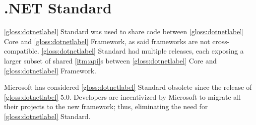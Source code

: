 \section{.NET Standard} \label{sec:netStandard}
\ref{gloss:dotnetlabel} Standard was used to share code between \ref{gloss:dotnetlabel} Core and \ref{gloss:dotnetlabel} Framework, as said frameworks are not cross-compatible. \ref{gloss:dotnetlabel} Standard had multiple releases, each exposing a larger subset of shared \ref{itm:api}s between \ref{gloss:dotnetlabel} Core and \ref{gloss:dotnetlabel} Framework.

Microsoft has considered \ref{gloss:dotnetlabel} Standard obsolete since the release of \ref{gloss:dotnetlabel} 5.0. Developers are incentivized by Microsoft to migrate all their projects to the new framework; thus, eliminating the need for \ref{gloss:dotnetlabel} Standard.